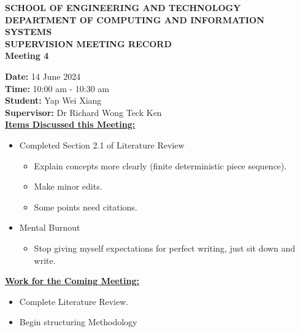 \documentclass[a4paper, 12pt]{report}
\begin{document}
	
	\onehalfspacing
	
	\begin{center}
		
		\textbf{\large SCHOOL OF ENGINEERING AND TECHNOLOGY}	\\
		\textbf{\small DEPARTMENT OF COMPUTING AND INFORMATION SYSTEMS} \\
		\vspace{1cm}
		\textbf{\LARGE SUPERVISION MEETING RECORD}\\
		\textbf{\normalsize Meeting 4}	%
		
	\end{center}
	
	\noindent			%
	\textbf{Date: } 14 June 2024 \\	%
	\textbf{Time: } 10:00 am - 10:30 am \\	%
	\textbf{Student: } Yap Wei Xiang \\
	\textbf{Supervisor: } Dr Richard Wong Teck Ken \\
	
	\noindent			%
	\textbf{\underline{Items Discussed this Meeting: }}
	\begin{itemize}	%
		\item Completed Section 2.1 of Literature Review
		\begin{itemize}
			\item Explain concepts more clearly (finite deterministic piece sequence).
			\item Make minor edits.
			\item Some points need citations.
		\end{itemize}
		\item Mental Burnout
		\begin{itemize}
			\item Stop giving myself expectations for perfect writing, just sit down and write.
		\end{itemize}
	\end{itemize}
	
	\noindent			%
	\textbf{\underline{Work for the Coming Meeting: }}
	\begin{itemize}	%
		\item Complete Literature Review.
		\item Begin structuring Methodology
	\end{itemize}
	
	\vfill
	
	
\end{document}
